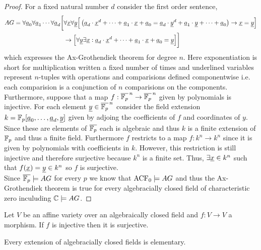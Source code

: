 \documentclass[12pt]{article}
\begin{document}
\begin{proof}
For a fixed natural number $d$ consider the first order sentence,
\begin{align*}
AG = \forall \underline{a}_0 \forall \underline{a}_1 \cdots \forall \underline{a}_d \bigg[ &  \forall \underline{x} \forall \underline{y} \Big[ \left( \underline{a}_d \cdot \underline{x}^d + \cdots + \underline{a}_1 \cdot \underline{x} + \underline{a}_0 = \underline{a}_d \cdot \underline{y}^d + \underline{a}_1 \cdot \underline{y} + \cdots + \underline{a}_0 \right) \to \underline{x} = \underline{y} \Big]
\\
&\to \Big[ \forall \underline{y} \exists \underline{x} : \underline{a}_d \cdot \underline{x}^d + \cdots + \underline{a}_1 \cdot \underline{x} + \underline{a}_0 = \underline{y}  \Big] \bigg]
\end{align*}
which expresses the Ax-Grothendiek theorem for degree $n$. Here exponentiation is short for multiplication written a fixed number of times and underlined variables represent $n$-tuples with operations and comparisions defined componentwise i.e. each comparision is a conjunction of $n$ comparisions on the components. Furthermore, suppose that a map $f : \overline{\mathbb{F}_{p}}^{\,n} \to \overline{\mathbb{F}_{p}}^{\,n}$ given by polynomials is injective. For each element $\underline{y} \in \overline{\mathbb{F}_{p}}^{\,n}$ consider the field extension $k = \mathbb{F}_{p}[\underline{a}_0, \dots, \underline{a}_d, \underline{y}]$ given by adjoing the coefficients of $f$ and coordinates of $y$. Since these are elements of $\overline{\mathbb{F}_{p}}$ each is algebraic and thus $k$ is a finite extension of $\mathbb{F}_{p}$ and thus a finite field. Furthermore $f$ restricts to a map $f : k^n \to k^n$ since it is given by polynomials with coefficients in $k$. However, this restriction is still injective and therefore surjective because $k^n$ is a finite set. Thus, $\exists \underline{x} \in k^n$ such that $f(\underline{x}) = \underline{y} \in k^n$ so $f$ is surjective. 
\bigskip\\
Since $\overline{\mathbb{F}_{p}} \models AG$ for every $p$ we know that $\mathrm{ACF}_{0} \models AG$ and thus the Ax-Grothendiek theorem is true for every algebracially closed field of characteristic zero inculuding $\mathbb{C} \models AG$. 
\end{proof}

\begin{theorem}
Let $V$ be an affine variety over an algebraically closed field and $f : V \to V$ a morphism. If $f$ is injective then it is surjective. 
\end{theorem}

\begin{theorem}
Every extension of algebracially closed fields is elementary.
\end{theorem}
\end{document}

